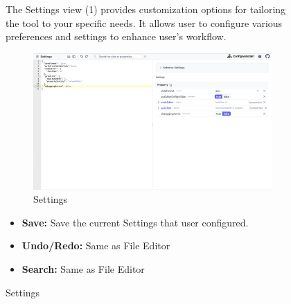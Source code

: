 \begin{figure}[h]
The Settings view (1) provides customization options for tailoring the tool to your specific needs.
It allows user to configure various preferences and settings to enhance user's workflow.
\begin{figure}[h]
    \includegraphics[width=3.5 in]{figures/settings}
    \caption{Settings}
    \label{fig:settings}
\end{figure}
\begin{itemize}
    \item \textbf{Save:} Save the current Settings that user configured.
    \item \textbf{Undo/Redo:} Same as File Editor
    \item \textbf{Search:} Same as File Editor
\end{itemize}


\end{figure}
